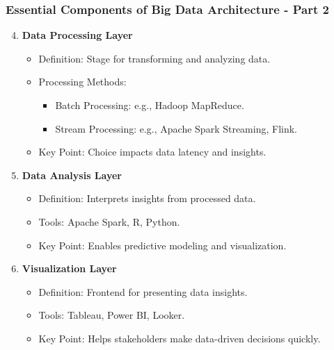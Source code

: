 \documentclass[aspectratio=169]{beamer}
\begin{document}
\begin{frame}[fragile]
    \frametitle{Essential Components of Big Data Architecture - Part 2}
    \begin{enumerate}
        \setcounter{enumi}{3} %
        \item \textbf{Data Processing Layer}
            \begin{itemize}
                \item Definition: Stage for transforming and analyzing data.
                \item Processing Methods:
                    \begin{itemize}
                        \item Batch Processing: e.g., Hadoop MapReduce.
                        \item Stream Processing: e.g., Apache Spark Streaming, Flink.
                    \end{itemize}
                \item Key Point: Choice impacts data latency and insights.
            \end{itemize}
        
        \item \textbf{Data Analysis Layer}
            \begin{itemize}
                \item Definition: Interprets insights from processed data.
                \item Tools: Apache Spark, R, Python.
                \item Key Point: Enables predictive modeling and visualization.
            \end{itemize}
        
        \item \textbf{Visualization Layer}
            \begin{itemize}
                \item Definition: Frontend for presenting data insights.
                \item Tools: Tableau, Power BI, Looker.
                \item Key Point: Helps stakeholders make data-driven decisions quickly.
            \end{itemize}
    \end{enumerate}
\end{frame}
\end{document}
